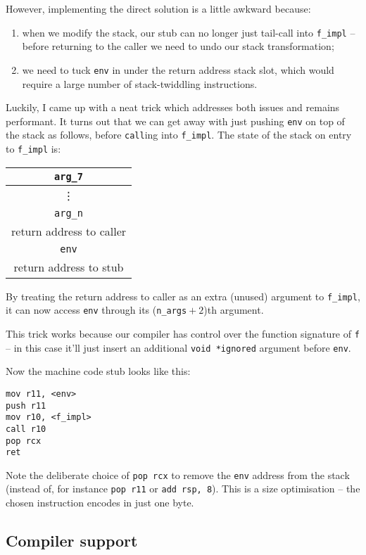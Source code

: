 \documentclass[12pt,a4paper,twoside,openright]{report}
\begin{document}
However, implementing the direct solution is a little awkward because:
\begin{enumerate}
  \item when we modify the stack, our stub can no longer just tail-call
    into \lstinline!f_impl! -- before returning to the caller we need to undo
    our stack transformation;
  \item we need to tuck \lstinline!env! in under the return address
    stack slot, which would require a large number of stack-twiddling
    instructions.
\end{enumerate}

Luckily, I came up with a neat trick which addresses both issues and remains
performant. It turns out that we can get away with just pushing \lstinline!env!
on top of the stack as follows, before \lstinline!call!ing into
\lstinline!f_impl!. The state of the stack on entry to \lstinline!f_impl! is:

\begin{tabular}{c}
  \lstinline!arg_7!
  \\ \hline
  \vdots
  \\ \hline
  \lstinline!arg_n!
  \\ \hline
  return address to caller
  \\ \hline
  \lstinline!env!
  \\ \hline\hline
  return address to stub
\end{tabular}

By treating the return address to caller as an extra (unused) argument to
\lstinline!f_impl!, it can now access \lstinline!env! through its
(\lstinline{n_args}${}+2$)th argument.

This trick works because our compiler has control over the function signature
of \lstinline{f} -- in this case it'll just insert an additional
\lstinline{void *ignored} argument before \lstinline{env}.

Now the machine code stub looks like this:

\begin{lstlisting}
mov r11, <env>
push r11
mov r10, <f_impl>
call r10
pop rcx
ret
\end{lstlisting}

Note the deliberate choice of \lstinline{pop rcx} to remove the
\lstinline{env} address from the stack (instead of, for instance
\lstinline{pop r11} or \lstinline{add rsp, 8}). This is a size optimisation --
the chosen instruction encodes in just one byte.

\subsection{Compiler support}
\end{document}
